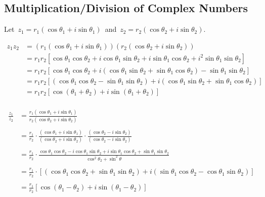 \documentclass[11pt,a4paper]{article}
\theoremstyle{definition}
\begin{document}
\subsection{Multiplication/Division of Complex Numbers}



Let $\, z_1 = r_1\left(\cos \theta_1 + i \sin \theta_1\right)\,$ and $\, z_2 = r_2\left(\cos \theta_2 + i \sin \theta_2\right)$.

\begin{align*}
z_1z_2 & = \left(r_1\left(\cos \theta_1 + i \sin \theta_1\right)\right)\left(r_2\left(\cos \theta_2 + i \sin \theta_2\right)\right)\\
& = r_1r_2\left[\cos \theta_1\cos \theta_2 + i\cos \theta_1\sin\theta_2 + i\sin\theta_1\cos\theta_2 + i^2 \sin \theta_1\sin\theta_2\right]\\
& = r_1r_2\left[\cos \theta_1\cos \theta_2 + i\left(\cos \theta_1\sin\theta_2 + \sin\theta_1\cos\theta_2\right) - \sin \theta_1\sin\theta_2\right]\\
& = r_1r_2\left[\left(\cos \theta_1\cos \theta_2  - \sin \theta_1\sin\theta_2\right) + i\left(\cos \theta_1\sin\theta_2 + \sin\theta_1\cos\theta_2\right)\right]\\
& = r_1r_2\left[\cos \left(\theta_1 + \theta_2\right) + i\sin\left(\theta_1 + \theta_2\right)\right]\\
\end{align*}



\begin{align*}
\frac{z_1}{z_2} & = \frac{r_1\left(\cos \theta_1 + i\sin \theta_1\right)}{r_2\left( \cos \theta_2 + i\sin \theta_2\right)}\\\\
& = \frac{r_1}{r_2}\cdot \frac{\left(\cos \theta_1 + i\sin \theta_1\right)}{\left( \cos \theta_2 + i\sin \theta_2\right)}\cdot \frac{\left( \cos \theta_2 - i\sin \theta_2\right)}{\left( \cos \theta_2 - i\sin \theta_2\right)}\\\\
& = \frac{r_1}{r_2}\cdot \frac{\cos \theta_1\cos \theta_2 - i\cos \theta_1\sin\theta_2 + i\sin\theta_1\cos\theta_2 + \sin\theta_1\sin\theta_2}{\cos^2\theta_2 + \sin^2\theta}\\\\
& = \frac{r_1}{r_2}\cdot \left[\left(\cos \theta_1\cos \theta_2 + \sin\theta_1\sin\theta_2\right) + i\left(\sin\theta_1\cos\theta_2 - \cos \theta_1\sin\theta_2\right)\right]\\\\
& = \frac{r_1}{r_2}\left[\cos \left(\theta_1-\theta_2\right) + i\sin \left(\theta_1-\theta_2\right)\right]\\\\
\end{align*}
\end{document}
